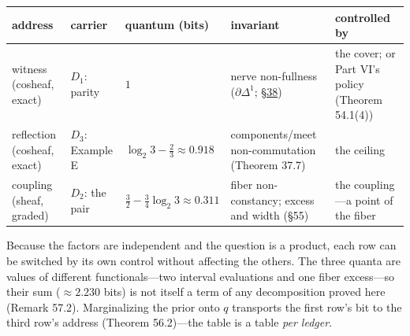 {\def\LTcaptype{none} %
\begin{longtable}[]{@{}
  >{\raggedright\arraybackslash}p{}
  >{\raggedright\arraybackslash}p{}
  >{\raggedright\arraybackslash}p{}
  >{\raggedright\arraybackslash}p{}
  >{\raggedright\arraybackslash}p{}@{}}
\toprule\noalign{}
\begin{minipage}[b]{\linewidth}\raggedright
address
\end{minipage} & \begin{minipage}[b]{\linewidth}\raggedright
carrier
\end{minipage} & \begin{minipage}[b]{\linewidth}\raggedright
quantum (bits)
\end{minipage} & \begin{minipage}[b]{\linewidth}\raggedright
invariant
\end{minipage} & \begin{minipage}[b]{\linewidth}\raggedright
controlled by
\end{minipage} \\
\midrule\noalign{}
\endhead
\bottomrule\noalign{}
\endlastfoot
witness (cosheaf, exact) & \(D_1\): parity & \(1\) & nerve non-fullness (\(\partial\Delta^1\); \hyperlink{sec:38}{§38}) & the cover; or Part VI's policy (Theorem 54.1(4)) \\
reflection (cosheaf, exact) & \(D_3\): Example E & \(\log_2 3 - \tfrac23 \approx 0.918\) & components/meet non-commutation (Theorem 37.7) & the ceiling \\
coupling (sheaf, graded) & \(D_2\): the pair & \(\tfrac32 - \tfrac34\log_2 3 \approx 0.311\) & fiber non-constancy; excess and width (§55) & the coupling---\hspace{0pt}a point of the fiber \\
\end{longtable}
}

Because the factors are independent and the question is a product, each row can be switched by its own control without affecting the others. The three quanta are values of different functionals---\hspace{0pt}two interval evaluations and one fiber excess---\hspace{0pt}so their sum (\(\approx 2.230\) bits) is not itself a term of any decomposition proved here (Remark 57.2). Marginalizing the prior onto \(q\) transports the first row's bit to the third row's address (Theorem 56.2)---\hspace{0pt}the table is a table \emph{per ledger}.


